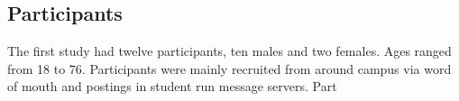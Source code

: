 \documentclass[thesis]{fputhesis}
\begin{document}
\begin{body}
\subsection{Participants}
The first study had twelve participants, ten males and two females. Ages ranged from 18 to 76. Participants were mainly recruited from around campus via word of mouth and postings in student run message servers. Part
\end{body}
\end{document}

